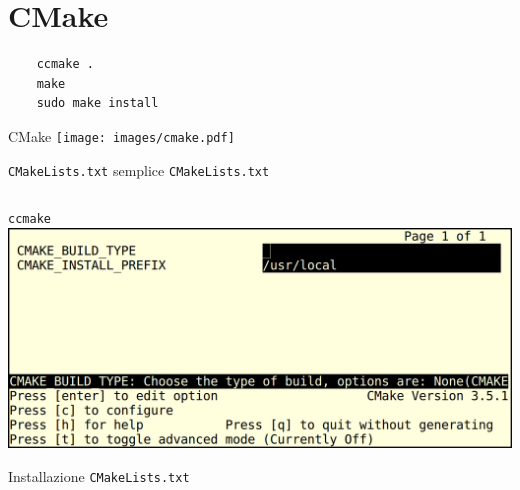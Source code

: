 \documentclass[xetex,table]{beamer}
\begin{document}
\section{CMake}

\begin{frame}[fragile]
  \begin{center}
  \begin{verbatim}
    ccmake .
    make
    sudo make install
  \end{verbatim}
  \end{center}
\end{frame}

\begin{frame}{CMake}
  \center\texttt{[image: images/cmake.pdf]}
\end{frame}

\begin{frame}{\texttt{CMakeLists.txt} semplice}
  \texttt{CMakeLists.txt}
  \inputminted[bgcolor=codebackground,frame=single]{cmake}{examples/4-cmake-1/CMakeLists.txt}
\end{frame}

\begin{frame}{\texttt{ccmake}}
  \center\includegraphics[height=0.4\textheight]{images/ccmake.png}
\end{frame}

\begin{frame}{Installazione}
  \texttt{CMakeLists.txt}
  \inputminted[bgcolor=codebackground,frame=single]{cmake}{examples/4-cmake-2/CMakeLists.txt}
\end{frame}
\end{document}
